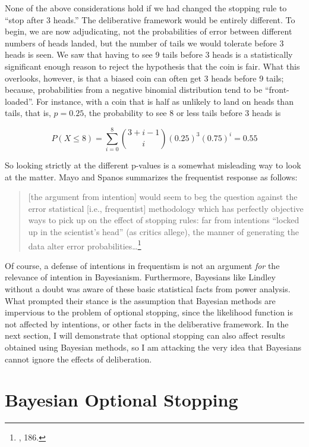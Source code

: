 None of the above considerations hold if we had changed the stopping
rule to ``stop after 3 heads.'' The deliberative framework would be
entirely different. To begin, we are now adjudicating, not the
probabilities of error between different numbers of heads landed, but
the number of tails we would tolerate before 3 heads is seen. We saw
that having to see 9 tails before 3 heads is a statistically significant
enough reason to reject the hypothesis that the coin is fair. What this
overlooks, however, is that a biased coin can often get 3 heads before 9
tails; because, probabilities from a negative binomial distribution tend
to be ``front-loaded''. For instance, with a coin that is half as
unlikely to land on heads than tails, that is, \(p=0.25\), the
probability to see 8 or less tails before 3 heads is

\[P(X \leq 8) =  \sum_{i=0}^{8} {3+i-1 \choose i} (0.25)^3 (0.75)^{i} =0.55\]

So looking strictly at the different p-values is a somewhat misleading
way to look at the matter. Mayo and Spanos summarizes the frequentist
response as follows:

\begin{quote}
{[}the argument from intention{]} would seem to beg the question against
the error statistical {[}i.e., frequentist{]} methodology which has
perfectly objective ways to pick up on the effect of stopping rules: far
from intentions ``locked up in the scientist's head'' (as critics
allege), the manner of generating the data alter error
probabilities\ldots{}\footnote{\cite{errorstat}, 186.}
\end{quote}

Of course, a defense of intentions in frequentism is not an argument
\emph{for} the relevance of intention in Bayesianism. Furthermore,
Bayesians like Lindley without a doubt was aware of these basic
statistical facts from power analysis. What prompted their stance is the
assumption that Bayesian methods are impervious to the problem of
optional stopping, since the likelihood function is not affected by
intentions, or other facts in the deliberative framework. In the next
section, I will demonstrate that optional stopping can also affect
results obtained using Bayesian methods, so I am attacking the very idea
that Bayesians cannot ignore the effects of deliberation.





\hypertarget{bayesian-early-stopping}{%
\section{Bayesian Optional
Stopping}\label{ch: bayesian-early-stopping}}

